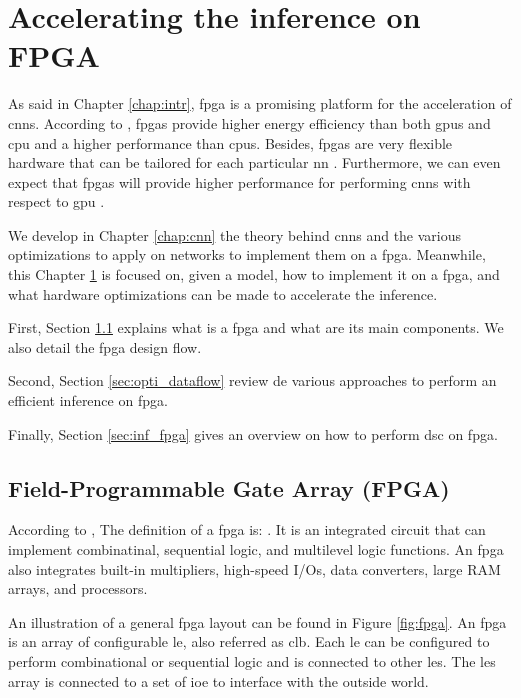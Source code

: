 \chapter{Accelerating the inference on FPGA} \label{chap:fpga}
%
%
As said in Chapter \ref{chap:intr}, \acrshort{fpga} is a promising platform for the acceleration of \acrshort{cnn}s. According to \textcite{mittal_survey_2014}, \acrshort{fpga}s provide higher energy efficiency than both \acrshort{gpu}s and \acrshort{cpu} and a higher performance than \acrshort{cpu}s. Besides, \acrshort{fpga}s are very flexible hardware that can be tailored for each particular \acrshort{nn} \cite{vestias_fast_2019}. Furthermore, we can even expect that \acrshort{fpga}s will provide higher performance for performing \acrshort{cnn}s with respect to \acrshort{gpu} \cite{nurvitadhi_can_2017}.

We develop in Chapter \ref{chap:cnn} the theory behind \acrshort{cnn}s and the various optimizations to apply on networks to implement them on a \acrshort{fpga}. Meanwhile, this Chapter \ref{chap:fpga} is focused on, given a model, how to implement it on a \acrshort{fpga}, and what hardware optimizations can be made to accelerate the inference.

First, Section \ref{sec:concept} explains what is a \acrshort{fpga} and what are its main components. We also detail the \acrshort{fpga} design flow.

Second, Section \ref{sec:opti_dataflow} review de various approaches to perform an efficient inference on \acrshort{fpga}.

Finally, Section \ref{sec:inf_fpga} gives an overview on how to perform \acrshort{dsc} on \acrshort{fpga}.
%
%
\section{Field-Programmable Gate Array (FPGA)} \label{sec:concept}
%
%
According to \textcite{harris_digital_2015}, The definition of a \acrshort{fpga} is: . It is an integrated circuit that can implement combinatinal, sequential logic, and multilevel logic functions. An \acrshort{fpga} also integrates built-in multipliers, high-speed I/Os, data converters, large RAM arrays, and processors.

An illustration of a general \acrshort{fpga} layout can be found in Figure \ref{fig:fpga}. An \acrshort{fpga} is an array of configurable \acrfull{le}, also referred as \acrfull{clb}. Each \acrshort{le} can be configured to perform combinational or sequential logic and is connected to other \acrshort{le}s. The \acrshort{le}s array is connected to a set of \acrfull{ioe} to interface with the outside world.

